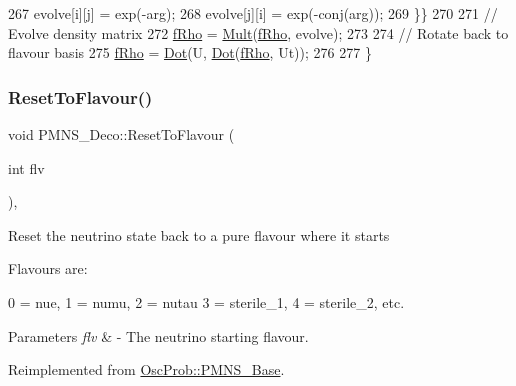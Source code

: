\begin{DoxyCode}
267     evolve[i][j] = exp(-arg);
268     evolve[j][i] = exp(-conj(arg));
269   \}\}
270   
271   \textcolor{comment}{// Evolve density matrix}
272   \hyperlink{classOscProb_1_1PMNS__Deco_a0488d62b4ef4cf5b43425769f5fcdbdf}{fRho} = \hyperlink{classOscProb_1_1PMNS__Deco_aacc9909556ca22aca30620893e12b0db}{Mult}(\hyperlink{classOscProb_1_1PMNS__Deco_a0488d62b4ef4cf5b43425769f5fcdbdf}{fRho}, evolve);
273   
274   \textcolor{comment}{// Rotate back to flavour basis}
275   \hyperlink{classOscProb_1_1PMNS__Deco_a0488d62b4ef4cf5b43425769f5fcdbdf}{fRho} = \hyperlink{classOscProb_1_1PMNS__Deco_a8d6b547de294c0d52d4208bde44fe171}{Dot}(U, \hyperlink{classOscProb_1_1PMNS__Deco_a8d6b547de294c0d52d4208bde44fe171}{Dot}(\hyperlink{classOscProb_1_1PMNS__Deco_a0488d62b4ef4cf5b43425769f5fcdbdf}{fRho}, Ut));
276 
277 \}
\end{DoxyCode}
\mbox{\label{classOscProb_1_1PMNS__Deco_a393940f176614e3ffebeea40cfe78a62}} 
\subsubsection{\texorpdfstring{Reset\+To\+Flavour()}{ResetToFlavour()}}
{\footnotesize\ttfamily void P\+M\+N\+S\+\_\+\+Deco\+::\+Reset\+To\+Flavour (\begin{DoxyParamCaption}\item[{int}]{flv }\end{DoxyParamCaption})\hspace{0.3cm}{\ttfamily [protected]}, {\ttfamily [virtual]}}

Reset the neutrino state back to a pure flavour where it starts

Flavours are\+: 
\begin{DoxyPre}
  0 = nue, 1 = numu, 2 = nutau
  3 = sterile\_1, 4 = sterile\_2, etc.
\end{DoxyPre}
 
\begin{DoxyParams}{Parameters}
{\em flv} & -\/ The neutrino starting flavour. \\
\hline
\end{DoxyParams}


Reimplemented from \hyperlink{classOscProb_1_1PMNS__Base_ac0d4bf8ff1318ef96d3dafa62e0cec25}{Osc\+Prob\+::\+P\+M\+N\+S\+\_\+\+Base}.



